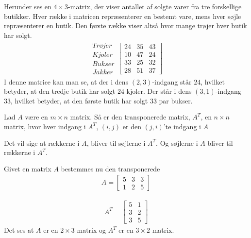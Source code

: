 \begin{eks}
Herunder ses en $4 \times 3$-matrix, der viser antallet af solgte varer fra tre forskellige butikker. Hver række i matricen repræsenterer en bestemt vare, mens hver søjle repræsenterer en butik. Den første række viser altså hvor mange trøjer hver butik har solgt.
\begin{align*}
\begin{matrix}
	Trøjer \\
	Kjoler \\
	Bukser \\
	Jakker
\end{matrix}
\begin{bmatrix}
	24 & 35 & 43 \\
	10 & 47 & 24 \\
	33 & 25 & 32 \\
	28 & 51 & 37
\end{bmatrix}
\end{align*}
I denne matrice kan man se, at der i dens $(2,3)$-indgang står $24$, hvilket betyder, at den tredje butik har solgt $24$ kjoler. Der står i dens $(3,1)$-indgang $33$, hvilket betyder, at den første butik har solgt $33$ par bukser.
\end{eks}

\begin{defn}
Lad $A$ være en $m \times n$ matrix. Så er den transponerede matrix, $A^T$, en $n \times n$ matrix, hvor hver indgang i $A^T$, $(i,j)$ er den $(j,i)$'te indgang i $A$
\label{def:(transmatrix)} 
\end{defn}
Det vil sige at rækkerne i $A$, bliver til søjlerne i $A^T$. Og søjlerne i $A$ bliver til rækkerne i $A^T$.

\begin{eks}
Givet en matrix $A$ 	bestemmes nu den transponerede
\begin{align*}
A = \begin{bmatrix}
	5 & 3 & 3 \\
	1 & 2 & 5
\end{bmatrix}
\end{align*}

\begin{align*}
A^T = \begin{bmatrix}
	5 & 1  \\
	3 & 2  \\
	3 & 5
\end{bmatrix}
\end{align*}
Det ses at $A$ er en $2 \times 3$ matrix og $A^T$ er en $3 \times 2$ matrix. 
\end{eks}


